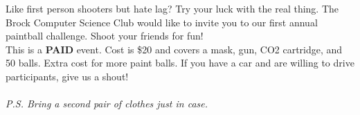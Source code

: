 \documentclass{article}
\begin{document}


Like first person shooters but hate lag? Try your luck with the real thing. The Brock Computer Science Club would like to invite you to our first annual paintball challenge. Shoot your friends for fun!\\

This is a \textbf{PAID} event. Cost is \$20 and covers a mask, gun, CO2 cartridge, and 50 balls. Extra cost for more paint balls. If you have a car and are willing to drive participants, give us a shout!\\ \\ \emph{P.S. Bring a second pair of clothes just in case.}

\end{document}
